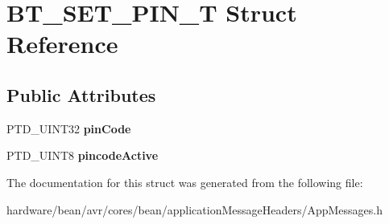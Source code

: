 \hypertarget{struct_b_t___s_e_t___p_i_n___t}{}\section{B\+T\+\_\+\+S\+E\+T\+\_\+\+P\+I\+N\+\_\+\+T Struct Reference}
\label{struct_b_t___s_e_t___p_i_n___t}
\subsection*{Public Attributes}
\begin{DoxyCompactItemize}
\item 
\hypertarget{struct_b_t___s_e_t___p_i_n___t_a94c77f9d979a537a554c81551b45c24c}{}P\+T\+D\+\_\+\+U\+I\+N\+T32 {\bfseries pin\+Code}\label{struct_b_t___s_e_t___p_i_n___t_a94c77f9d979a537a554c81551b45c24c}

\item 
\hypertarget{struct_b_t___s_e_t___p_i_n___t_a857fc35778ecf9700cb5d1ea97e4a2f5}{}P\+T\+D\+\_\+\+U\+I\+N\+T8 {\bfseries pincode\+Active}\label{struct_b_t___s_e_t___p_i_n___t_a857fc35778ecf9700cb5d1ea97e4a2f5}

\end{DoxyCompactItemize}


The documentation for this struct was generated from the following file\+:\begin{DoxyCompactItemize}
\item 
hardware/bean/avr/cores/bean/application\+Message\+Headers/App\+Messages.\+h\end{DoxyCompactItemize}
